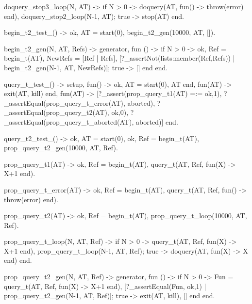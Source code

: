 \documentclass[11pt]{article}
\renewenvironment{verbatim}{}{}
\begin{document}
\begin{verbatim}
doquery_stop3_loop(N, AT) ->
    if N > 0 ->
           doquery(AT, fun() -> throw(error) end),
           doquery_stop2_loop(N-1, AT);
       true ->
           stop(AT)
    end.

%%% Test begin_t and uniqueness of returned references %%%
begin_t2_test_() ->
    {ok, AT} = start(0),
    begin_t2_gen(10000, AT, []).

%
begin_t2_gen(N, AT, Refs) ->
       {generator,
        fun () ->
            if N > 0 ->
                    {ok, Ref} = begin_t(AT),
                    NewRefs = [Ref | Refs],
                    [?_assertNot(lists:member(Ref,Refs))
                     | begin_t2_gen(N-1, AT, NewRefs)];
               true ->
                   []
            end
        end}.


%%% Test query_t. Assumes begin_t works for these cases. %%%
query_t_test_() -> 
    {setup,
    fun() -> {ok, AT} = start(0), AT end,
    fun(AT) -> exit(AT, kill) end,
    fun(AT) ->
    [?_assert(prop_query_t1(AT) =:= {ok,1}), %Test return {ok, result}
     ?_assertEqual(prop_query_t_error(AT), aborted), %Test return aborted on function error
     ?_assertEqual(prop_query_t2(AT), {ok,0}), %Test server state is not touched
     ?_assertEqual(prop_query_t_aborted(AT), aborted)] %Test if error function aborts transaction
    end}.

query_t2_test_() -> %Tests if transaction state is touched by query_t
    {ok, AT} = start(0),
    {ok, Ref} = begin_t(AT),
    prop_query_t2_gen(10000, AT, Ref).

%
prop_query_t1(AT) -> 
    {ok, Ref} = begin_t(AT),
    query_t(AT, Ref, fun(X) -> X+1 end).

prop_query_t_error(AT) -> 
    {ok, Ref} = begin_t(AT),
    query_t(AT, Ref, fun() -> throw(error) end).

prop_query_t2(AT) -> 
    {ok, Ref} = begin_t(AT),
    prop_query_t_loop(10000, AT, Ref).

prop_query_t_loop(N, AT, Ref) -> %Should return same result as always
    if N > 0 ->
           query_t(AT, Ref, fun(X) -> X+1 end),
           prop_query_t_loop(N-1, AT, Ref);
       true ->
           doquery(AT, fun(X) -> X end) 
    end.

prop_query_t2_gen(N, AT, Ref) -> %Server state should not be touched by query_t
   {generator,
    fun () ->
        if N > 0 ->
               Fun = query_t(AT, Ref, fun(X) -> X+1 end),
               [?_assertEqual(Fun, {ok,1})
                | prop_query_t2_gen(N-1, AT, Ref)];
           true ->
                exit(AT, kill),
                []
        end
    end}.


\end{verbatim}
\end{document}
